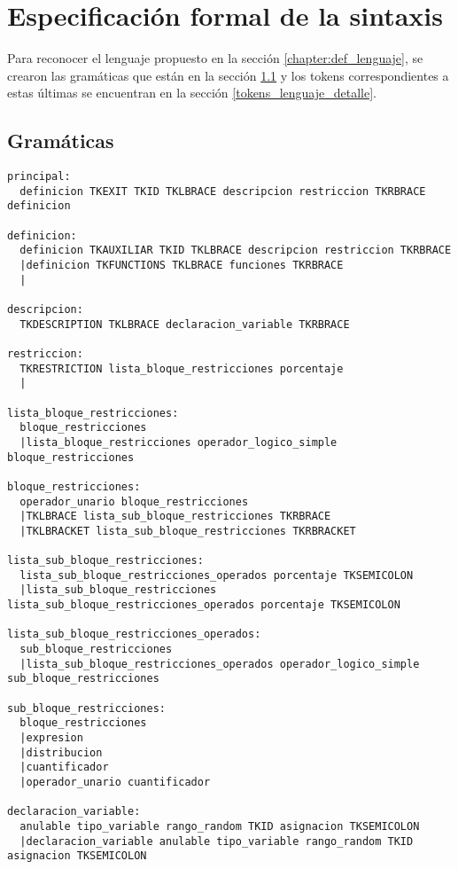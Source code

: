 \chapter{Especificación formal de la sintaxis}\label{gramaticas_lenguaje}

Para reconocer el lenguaje propuesto en la sección \ref{chapter:def_lenguaje},
se crearon las gramáticas que están en la sección \ref{gramaticas_lenguaje_detalle}
y los tokens correspondientes a estas últimas se encuentran en la sección 
\ref{tokens_lenguaje_detalle}.

\section{Gramáticas} \label{gramaticas_lenguaje_detalle}

\begin{lstlisting}[mathescape]
principal:
  definicion TKEXIT TKID TKLBRACE descripcion restriccion TKRBRACE definicion

definicion:
  definicion TKAUXILIAR TKID TKLBRACE descripcion restriccion TKRBRACE
  |definicion TKFUNCTIONS TKLBRACE funciones TKRBRACE
  |

descripcion:
  TKDESCRIPTION TKLBRACE declaracion_variable TKRBRACE 

restriccion:
  TKRESTRICTION lista_bloque_restricciones porcentaje 
  |

lista_bloque_restricciones:
  bloque_restricciones
  |lista_bloque_restricciones operador_logico_simple bloque_restricciones 

bloque_restricciones:
  operador_unario bloque_restricciones 
  |TKLBRACE lista_sub_bloque_restricciones TKRBRACE 
  |TKLBRACKET lista_sub_bloque_restricciones TKRBRACKET 

lista_sub_bloque_restricciones:
  lista_sub_bloque_restricciones_operados porcentaje TKSEMICOLON 
  |lista_sub_bloque_restricciones lista_sub_bloque_restricciones_operados porcentaje TKSEMICOLON 

lista_sub_bloque_restricciones_operados:
  sub_bloque_restricciones 
  |lista_sub_bloque_restricciones_operados operador_logico_simple sub_bloque_restricciones 

sub_bloque_restricciones:
  bloque_restricciones 
  |expresion
  |distribucion 
  |cuantificador 
  |operador_unario cuantificador 

declaracion_variable:
  anulable tipo_variable rango_random TKID asignacion TKSEMICOLON 
  |declaracion_variable anulable tipo_variable rango_random TKID asignacion TKSEMICOLON 


\end{lstlisting}
